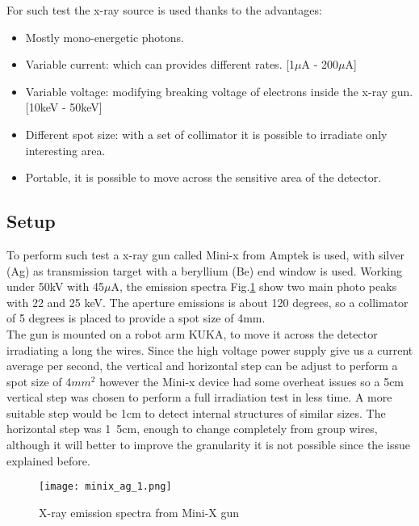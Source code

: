 For such test the x-ray source is used thanks to the advantages:\par
\begin{itemize}[noitemsep, topsep=0pt, parsep=0pt, partopsep=2pt]
	\item Mostly mono-energetic photons.
	\item Variable current: which can provides different rates. [\unit{1}{$\mu$A} - \unit{200}{$\mu$A}]
	\item Variable voltage: modifying breaking voltage of electrons inside the x-ray gun. [\unit{10}{keV} - \unit{50}{keV}]
	\item Different spot size: with a set of collimator it is possible to irradiate only interesting area.
	\item Portable, it is possible to move across the sensitive area of the detector.
\end{itemize}


\subsection{Setup}
To perform such test a x-ray gun called Mini-x from Amptek is used, with silver (Ag) as transmission target with a
beryllium (Be) end window is used.  Working under \unit{50}{kV} with \unit{45}{$\mu$A}, the emission spectra
Fig.\ref{fig:minixgun} show two main photo peaks with 22 and 25 keV. The aperture emissions is about 120 degrees, so a
collimator of 5 degrees is placed to provide a spot size of \unit{4}{mm}.\\ The gun is mounted on a robot arm KUKA, to
move it across the detector irradiating a long the wires. Since the high voltage power supply give us a current average
per second, the vertical and horizontal step can be adjust to perform a spot size of 4$mm^2$ however the Mini-x device
had some overheat issues so a \unit{5}{cm} vertical step was chosen to perform a full irradiation test in less time. A
more suitable step would be \unit{1}{cm} to detect internal structures of similar sizes. The horizontal step was
\unit{1.5}{cm}, enough to change completely from group wires, although it will better to improve the granularity it is
not possible since the issue explained before.


\begin{figure}[ht]
	\centering
	\texttt{[image: minix\_ag\_1.png]}
	\caption{X-ray emission spectra from Mini-X gun}\label{fig:minixgun}
\end{figure}

